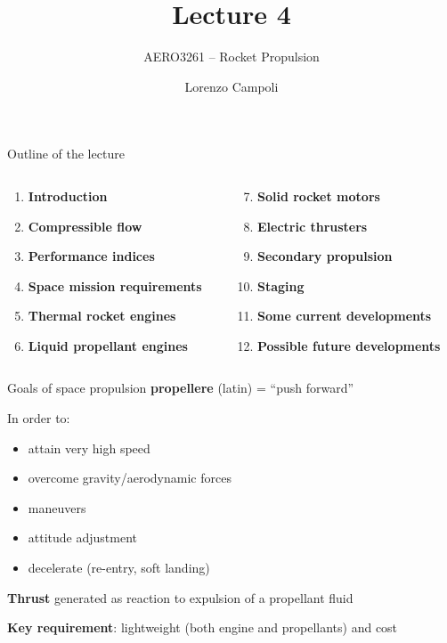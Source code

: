 \documentclass[
  ignorenonframetext,
]{beamer}
\title{Lecture 4}
\subtitle{AERO3261 -- Rocket Propulsion}
\author{Lorenzo Campoli}
\date{}
\providecommand{\tightlist}{%
  \setlength{\itemsep}{0pt}\setlength{\parskip}{0pt}}\usepackage{longtable,booktabs,array}
\begin{document}
\frame{\titlepage}
\begin{frame}{Outline of the lecture}
\protect\hypertarget{outline-of-the-lecture}{}
\begin{columns}[T]
\begin{column}{0.5\textwidth}
\begin{enumerate}
\tightlist
\item
  \textbf{Introduction}
\item
  \textbf{Compressible flow}
\item
  \textbf{Performance indices}
\item
  \textbf{Space mission requirements}
\item
  \textbf{Thermal rocket engines}
\item
  \textbf{Liquid propellant engines}
\end{enumerate}
\end{column}

\begin{column}{0.5\textwidth}
\begin{enumerate}
\setcounter{enumi}{6}
\tightlist
\item
  \textbf{Solid rocket motors}
\item
  \textbf{Electric thrusters}
\item
  \textbf{Secondary propulsion}
\item
  \textbf{Staging}
\item
  \textbf{Some current developments}
\item
  \textbf{Possible future developments}
\end{enumerate}
\end{column}
\end{columns}
\end{frame}

\begin{frame}{Goals of space propulsion}
\protect\hypertarget{goals-of-space-propulsion}{}
\textbf{propellere} (latin) = ``push forward''

\begin{block}{In order to:}
\protect\hypertarget{in-order-to}{}
\begin{itemize}
\tightlist
\item
  attain very high speed
\item
  overcome gravity/aerodynamic forces
\item
  maneuvers
\item
  attitude adjustment
\item
  decelerate (re-entry, soft landing)
\end{itemize}

\textbf{Thrust} generated as reaction to expulsion of a propellant fluid

\textbf{Key requirement}: lightweight (both engine and propellants) and
cost
\end{block}
\end{frame}
\end{document}
